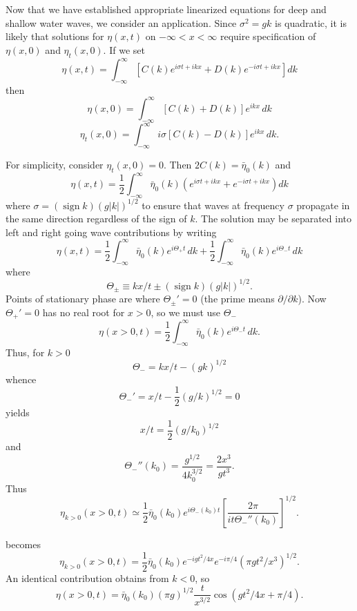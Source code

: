 Now that we have established appropriate linearized equations for deep and shallow
water waves, we consider an application. Since $\sigma^2=gk$ is quadratic, it is likely that
solutions for $\eta(x,t)$ on $-\infty<x<\infty$ require specification of $\eta(x,0)$ and $\eta_t(x,0)$. If we
set
\[
	\eta(x,t)=\int_{-\infty}^{\infty}
	\left[C(k)e^{i\sigma t+ikx}+D(k)e^{-i\sigma t+ikx}\right]dk
\]
then
\[
	\eta(x,0)=\int_{-\infty}^{\infty}[C(k)+D(k)]e^{ikx}\,dk
\]
\[
	\eta_t(x,0)=\int_{-\infty}^{\infty}i\sigma[C(k)-D(k)]e^{ikx}\,dk.
\]

\sourcepagebreak

For simplicity, consider $\eta_t(x,0)=0$. Then $2C(k)=\bar\eta_0(k)$ and
\[
	\eta(x,t)=\frac12\int_{-\infty}^{\infty}
	\bar\eta_0(k)\left(e^{i\sigma t+ikx}+e^{-i\sigma t+ikx}\right)dk
\]
where $\sigma=(\operatorname{sign}k)(g|k|)^{1/2}$ to ensure that waves at frequency $\sigma$ propagate in the same
direction regardless of the sign of $k$. The solution may be separated into left and right
going wave contributions by writing
\[
	\eta(x,t)=\frac12\int_{-\infty}^{\infty}\bar\eta_0(k)e^{i\Theta_+t}\,dk
	+\frac12\int_{-\infty}^{\infty}\bar\eta_0(k)e^{i\Theta_-t}\,dk
\]
where
\[
	\Theta_\pm\equiv kx/t\pm(\operatorname{sign}k)(g|k|)^{1/2}.
\]
Points of stationary phase are where $\Theta_\pm'=0$ (the prime means $\partial/\partial k$). Now
$\Theta_+'=0$ has no real root for $x>0$, so we must use $\Theta_-$
\[
	\eta(x>0,t)=\frac12\int_{-\infty}^{\infty}\bar\eta_0(k)e^{i\Theta_-t}\,dk.
\]
Thus, for $k>0$
\[
	\Theta_-=kx/t-(gk)^{1/2}
\]
whence
\[
	\Theta_-'=x/t-\frac12(g/k)^{1/2}=0
\]
yields
\[
	x/t=\frac12(g/k_0)^{1/2}
\]
and
\[
	\Theta_-''(k_0)=\frac{g^{1/2}}{4k_0^{3/2}}=\frac{2x^3}{gt^3}.
\]
Thus
\[
	\eta_{k>0}(x>0,t)\simeq
	\frac12\bar\eta_0(k_0)e^{i\Theta_-(k_0)t}
	\left[\frac{2\pi}{it\Theta_-''(k_0)}\right]^{1/2}.
\]

\sourcepagebreak

becomes
\[
	\eta_{k>0}(x>0,t)=\frac12\bar\eta_0(k_0)e^{-igt^2/4x}e^{-i\pi/4}
	\left(\pi gt^2/x^3\right)^{1/2}.
\]
An identical contribution obtains from $k<0$, so
\[
	\eta(x>0,t)=\bar\eta_0(k_0)(\pi g)^{1/2}\frac{t}{x^{3/2}}
	\cos(gt^2/4x+\pi/4).
\]

